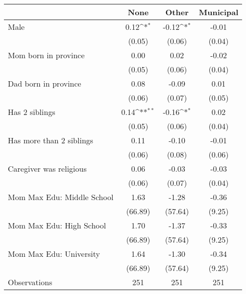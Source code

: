 {
\def\sym#1{\ifmmode^{#1}\else\(^{#1}\)\fi}
\begin{tabular}{l*{3}{c}}
\toprule
                    &\multicolumn{1}{c}{None}&\multicolumn{1}{c}{Other}&\multicolumn{1}{c}{Municipal}\\
\midrule
Male                &        0.12\sym{*}  &       -0.12\sym{*}  &       -0.01         \\
                    &      (0.05)         &      (0.06)         &      (0.04)         \\
\addlinespace
Mom born in province&        0.00         &        0.02         &       -0.02         \\
                    &      (0.05)         &      (0.06)         &      (0.04)         \\
\addlinespace
Dad born in province&        0.08         &       -0.09         &        0.01         \\
                    &      (0.06)         &      (0.07)         &      (0.05)         \\
\addlinespace
Has 2 siblings      &        0.14\sym{**} &       -0.16\sym{*}  &        0.02         \\
                    &      (0.05)         &      (0.06)         &      (0.04)         \\
\addlinespace
Has more than 2 siblings&        0.11         &       -0.10         &       -0.01         \\
                    &      (0.06)         &      (0.08)         &      (0.06)         \\
\addlinespace
Caregiver was religious&        0.06         &       -0.03         &       -0.03         \\
                    &      (0.06)         &      (0.07)         &      (0.04)         \\
\addlinespace
Mom Max Edu: Middle School&        1.63         &       -1.28         &       -0.36         \\
                    &     (66.89)         &     (57.64)         &      (9.25)         \\
\addlinespace
Mom Max Edu: High School&        1.70         &       -1.37         &       -0.33         \\
                    &     (66.89)         &     (57.64)         &      (9.25)         \\
\addlinespace
Mom Max Edu: University&        1.64         &       -1.30         &       -0.34         \\
                    &     (66.89)         &     (57.64)         &      (9.25)         \\
\midrule
Observations        &         251         &         251         &         251         \\
\bottomrule
\end{tabular}
}
